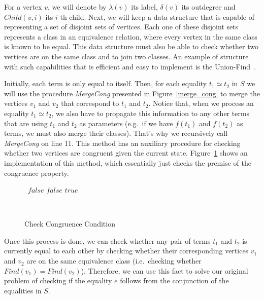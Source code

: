 For a vertex $v$, we will denote by $\lambda(v)$ its label, $\delta(v)$ its outdegree and $Child(v, i)$ its $i$-th child.
Next, we will keep a data structure that is capable of representing a set of disjoint sets of vertices. Each one of these disjoint sets represents a class in an equivalence relation, where every vertex in the same class is known to be equal. This data structure must also be able to check whether two vertices are on the same class and to join two classes. An example of structure with such capabilities that is efficient and easy to implement is the Union-Find~\cite{union_find}.

Initially, each term is only equal to itself. Then, for each equality $t_{1} \simeq t_{2}$ in $S$ we will use the procedure \textit{MergeCong} presented in Figure~\ref{merge_cong} to merge the vertices $v_{1}$ and $v_{2}$ that correspond to $t_{1}$ and $t_{2}$.
Notice that, when we process an equality $t_{1} \simeq t_{2}$, we also have to propagate this information to any other terms that are using $t_{1}$ and $t_{2}$ as parameters (e.g.~if we have $f(t_{1})$ and $f(t_{2})$ as terms, we must also merge their classes). That's why we recursively call \textit{MergeCong} on line 11.
This method has an auxiliary procedure for checking whether two vertices are congruent given the current state. Figure~\ref{cong_cond} shows an implementation of this method, which essentially just checks the premise of the congruence property.

\begin{figure}[t]
\begin{algorithmic}[1]
    \State\Return~$false$
  \EndIf
      \State\Return $false$
    \EndIf
  \EndFor
  \State\Return $true$
  \EndFunction
\end{algorithmic}
\caption{Check Congruence Condition}~\label{cong_cond}
\end{figure}


Once this process is done, we can check whether any pair of terms $t_{1}$ and $t_{2}$ is currently equal to each other by checking whether their corresponding vertices $v_{1}$ and $v_{2}$ are on the same equivalence class (i.e.\ checking whether $Find(v_{1}) = Find(v_{2})$). Therefore, we can use this fact to solve our original problem of checking if the equality $e$ follows from the conjunction of the equalities in $S$.

